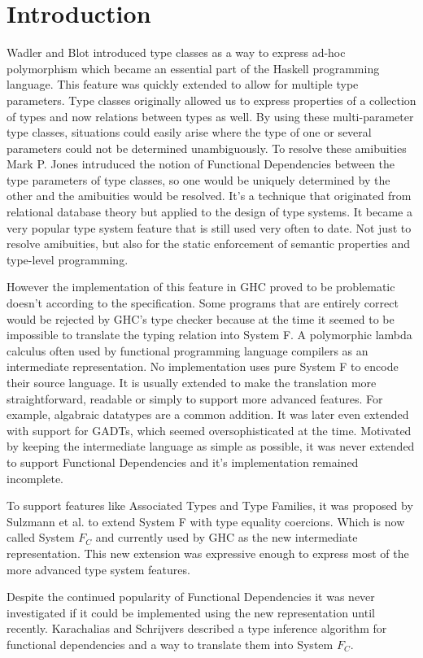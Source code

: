 \section{Introduction}
Wadler and Blot \cite{Wadler:1989:MAP:75277.75283} introduced type classes as a
way to express ad-hoc polymorphism which became an essential part of the Haskell
programming language. This feature was quickly extended to allow for multiple
type parameters. Type classes originally allowed us to express properties of a
collection of types and now relations between types as well. By using
these multi-parameter type classes, situations could easily arise where the type
of one or several parameters could not be determined unambiguously. To resolve
these amibuities Mark P. Jones intruduced the notion of Functional Dependencies
\cite{Jones00typeclasses} between the type parameters of type classes, so one
would be uniquely determined by the other and the amibuities would be resolved.
It's a technique that originated from relational database theory but applied to
the design of type systems. It became a very popular type system feature that is
still used very often to date. Not just to resolve amibuities, but also for the
static enforcement of semantic properties and type-level programming.

However the implementation of this feature in GHC proved to be problematic
doesn't according to the specification.  Some programs that are entirely correct
would be rejected by GHC's type checker because at the time it seemed to be
impossible to translate the typing relation into System F. A polymorphic
lambda calculus often used by functional programming language compilers as an
intermediate representation. No implementation uses pure System F to encode
their source language. It is usually extended to make the translation more
straightforward, readable or simply to support more advanced features. For
example, algabraic datatypes are a common addition. It was later even extended
with support for GADTs, which seemed oversophisticated at the time. Motivated by
keeping the intermediate language as simple as possible, it was never extended
to support Functional Dependencies and it's implementation remained incomplete.

To support features like Associated Types and Type Families, it was proposed by
Sulzmann et al. \cite{Sulzmann:2007:SFT:1190315.1190324} to extend System F with
type equality coercions. Which is now called System $F_C$ and currently used by
GHC as the new intermediate representation. This new extension was expressive
enough to express most of the more advanced type system features.

Despite the continued popularity of Functional Dependencies it was never
investigated if it could be implemented using the new representation until
recently. Karachalias and Schrijvers \cite{Karachalias:2017:EFD:3122955.3122966}
described a type inference algorithm for functional dependencies and a way to
translate them into System $F_C$.
